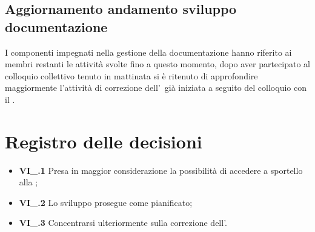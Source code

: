 \subsection{Aggiornamento andamento sviluppo documentazione}
I componenti impegnati nella gestione della documentazione hanno riferito ai membri restanti le attività svolte fino a questo momento, dopo aver partecipato al colloquio collettivo tenuto in mattinata si è ritenuto di approfondire maggiormente l'attività di correzione dell'\AdR\ già iniziata a seguito del colloquio con il \CR{}.

\section{Registro delle decisioni}
\begin{itemize}
	\item \textbf{VI\_\Data.1} Presa in maggior considerazione la possibilità di accedere a sportello alla ;
	\item \textbf{VI\_\Data.2} Lo sviluppo prosegue come pianificato;
	\item \textbf{VI\_\Data.3} Concentrarsi ulteriormente sulla correzione dell'\AdR{}.
\end{itemize}